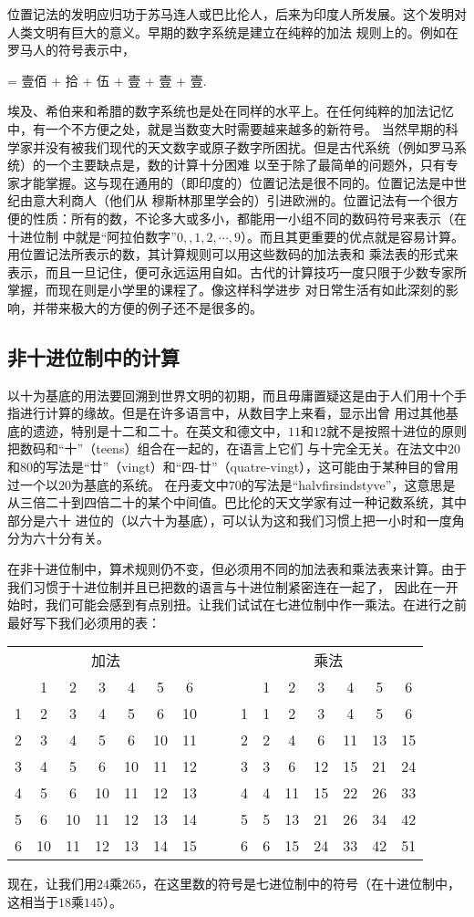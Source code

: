 位置记法的发明应归功于苏马连人或巴比伦人，后来为印度人所发展。这个发明对人类文明有巨大的意义。早期的数字系统是建立在纯粹的加法
规则上的。例如在罗马人的符号表示中，
\begin{center}
\uppercase\expandafter{} =  壹佰 + 拾 + 伍 + 壹 + 壹 + 壹.
\end{center}
埃及、希伯来和希腊的数字系统也是处在同样的水平上。在任何纯粹的加法记忆中，有一个不方便之处，就是当数变大时需要越来越多的新符号。
当然早期的科学家并没有被我们现代的天文数字或原子数字所困扰。但是古代系统（例如罗马系统）的一个主要缺点是，数的计算十分困难
以至于除了最简单的问题外，只有专家才能掌握。这与现在通用的（即印度的）位置记法是很不同的。位置记法是中世纪由意大利商人（他们从
穆斯林那里学会的）引进欧洲的。位置记法有一个很方便的性质：所有的数，不论多大或多小，都能用一小组不同的数码符号来表示（在十进位制
中就是“阿拉伯数字”$0,,1,2,\cdots,9$）。而且其更重要的优点就是容易计算。用位置记法所表示的数，其计算规则可以用这些数码的加法表和
乘法表的形式来表示，而且一旦记住，便可永远运用自如。古代的计算技巧一度只限于少数专家所掌握，而现在则是小学里的课程了。像这样科学进步
对日常生活有如此深刻的影响，并带来极大的方便的例子还不是很多的。
\subsection{非十进位制中的计算}
以十为基底的用法要回溯到世界文明的初期，而且毋庸置疑这是由于人们用十个手指进行计算的缘故。但是在许多语言中，从数目字上来看，显示出曾
用过其他基底的遗迹，特别是十二和二十。在英文和德文中，$11$和$12$就不是按照十进位的原则把数码和“十”（teens）组合在一起的，在语言上它们
与十完全无关。在法文中$20$和$80$的写法是“廿”（vingt）和“四-廿”（quatre-vingt），这可能由于某种目的曾用过一个以$20$为基底的系统。
在丹麦文中$70$的写法是“halvfirsindstyve”，这意思是从三倍二十到四倍二十的某个中间值。巴比伦的天文学家有过一种记数系统，其中部分是六十
进位的（以六十为基底），可以认为这和我们习惯上把一小时和一度角分为六十分有关。

在非十进位制中，算术规则仍不变，但必须用不同的加法表和乘法表来计算。由于我们习惯于十进位制并且已把数的语言与十进位制紧密连在一起了，
因此在一开始时，我们可能会感到有点别扭。让我们试试在七进位制中作一乘法。在进行之前最好写下我们必须用的表：
\begin{center}
\begin{tabular}{c|ccccccccc|cccccc}
\multicolumn{7}{c}{加法} & & & \multicolumn{7}{c}{乘法} \\
  & 1 & 2 & 3 & 4 & 5 & 6  & & & & 1 & 2 & 3 & 4 & 5 & 6 \\
\cline{1-7}\cline{10-16}
1 & 2 & 3 & 4 & 5 & 6 & 10 & & &1& 1 & 2 & 3 & 4 & 5 & 6 \\
2 & 3 & 4 & 5 & 6 & 10& 11 & & &2& 2 & 4 & 6 & 11& 13& 15 \\
3 & 4 & 5 & 6 & 10& 11& 12 & & &3& 3 & 6 & 12& 15& 21& 24 \\
4 & 5 & 6 & 10& 11& 12& 13 & & &4& 4 & 11& 15& 22& 26& 33 \\
5 & 6 & 10& 11& 12& 13& 14 & & &5& 5 & 13& 21& 26& 34& 42 \\
6 & 10& 11& 12& 13& 14& 15 & & &6& 6 & 15& 24& 33& 42& 51 \\
\end{tabular}
\end{center}

现在，让我们用$24$乘$265$，在这里数的符号是七进位制中的符号（在十进位制中，这相当于$18$乘$145$）。